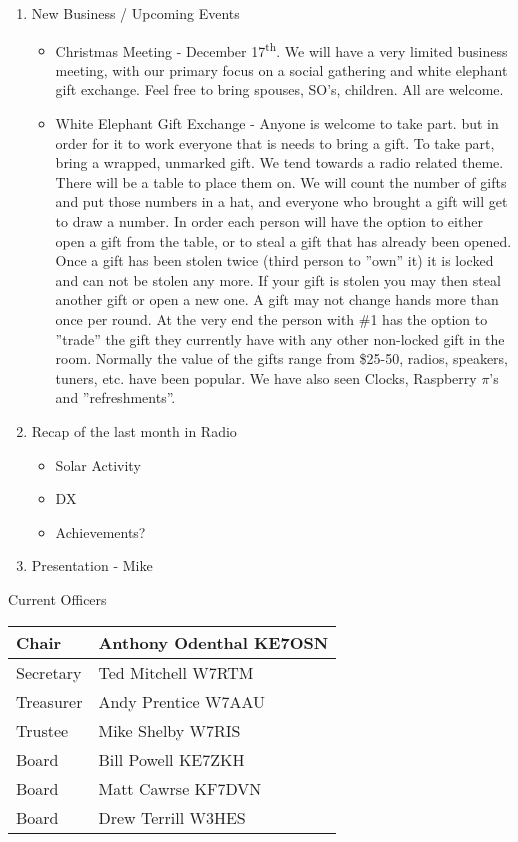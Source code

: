 \documentclass[letter,11pt]{extarticle}
\begin{document}
\begin{enumerate}
		\item  New Business / Upcoming Events
			\begin{itemize}
				\item  Christmas Meeting - December 17\textsuperscript{th}. We will have a very limited business meeting, with our primary focus on a social gathering and white elephant gift exchange. Feel free to bring spouses, SO's, children. All are welcome.
				\item White Elephant Gift Exchange - Anyone is welcome to take part. but in order for it to work everyone that is needs to bring a gift. To take part, bring a wrapped, unmarked gift. We tend towards a radio related theme. There will be a table to place them on. We will count the number of gifts and put those numbers in a hat, and everyone who brought a gift will get to draw a number. In order each person will have the option to either open a gift from the table, or to steal a gift that has already been opened. Once a gift has been stolen twice (third person to ''own'' it) it is locked and can not be stolen any more. If your gift is stolen you may then steal another gift or open a new one. A gift may not change hands more than once per round. At the very end the person with \#1 has the option to ''trade'' the gift they currently have with any other non-locked gift in the room. Normally the value of the gifts range from \$25-50, radios, speakers, tuners, etc. have been popular. We have also seen Clocks, Raspberry $\pi$'s and ''refreshments''. 
			\end{itemize}
		\item Recap of the last month in Radio
			\begin{itemize}
				\item Solar Activity
				\item DX
				\item Achievements?
			\end{itemize}
		\item  Presentation - Mike
	\end{enumerate}


	Current Officers \\
	\begin{tabular}{|l|l|} \hline
		Chair & Anthony Odenthal KE7OSN \\ \hline
		Secretary & Ted Mitchell W7RTM \\ \hline
		Treasurer & Andy Prentice W7AAU \\ \hline
		Trustee & Mike Shelby W7RIS   \\ \hline
		Board & Bill Powell KE7ZKH \\ \hline
		Board & Matt Cawrse KF7DVN \\ \hline
		Board & Drew Terrill W3HES\\ \hline
	\end{tabular}
	
	\subsection*{}
	
\end{document}
